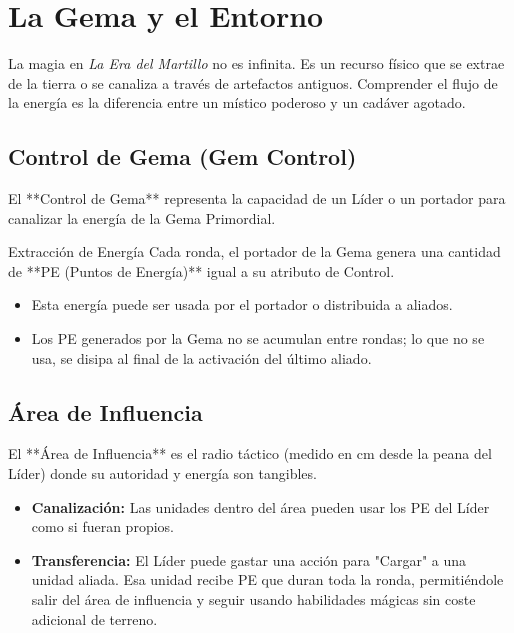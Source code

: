 
\chapter{La Gema y el Entorno}

La magia en \textit{La Era del Martillo} no es infinita. Es un recurso físico que se extrae de la tierra o se canaliza a través de artefactos antiguos. Comprender el flujo de la energía es la diferencia entre un místico poderoso y un cadáver agotado.

\section{Control de Gema (Gem Control)}
El **Control de Gema** representa la capacidad de un Líder o un portador para canalizar la energía de la Gema Primordial. 

\begin{reglaespecial}{Extracción de Energía}
Cada ronda, el portador de la Gema genera una cantidad de **PE (Puntos de Energía)** igual a su atributo de Control. 
\begin{itemize}
    \item Esta energía puede ser usada por el portador o distribuida a aliados.
    \item Los PE generados por la Gema no se acumulan entre rondas; lo que no se usa, se disipa al final de la activación del último aliado.
\end{itemize}
\end{reglaespecial}

\section{Área de Influencia}
El **Área de Influencia** es el radio táctico (medido en cm desde la peana del Líder) donde su autoridad y energía son tangibles.

\begin{itemize}
    \item \textbf{Canalización:} Las unidades dentro del área pueden usar los PE del Líder como si fueran propios.
    \item \textbf{Transferencia:} El Líder puede gastar una acción para "Cargar" a una unidad aliada. Esa unidad recibe PE que duran toda la ronda, permitiéndole salir del área de influencia y seguir usando habilidades mágicas sin coste adicional de terreno.
\end{itemize}

